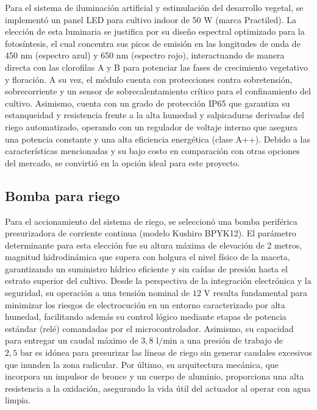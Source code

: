 Para el sistema de iluminación artificial y estimulación del desarrollo vegetal, se implementó un panel LED para cultivo indoor de 50 W (marca Practiled). La elección de esta luminaria se justifica por su diseño espectral optimizado para la fotosíntesis, el cual concentra sus picos de emisión en las longitudes de onda de 450 nm (espectro azul) y 650 nm (espectro rojo), interactuando de manera directa con las clorofilas A y B para potenciar las fases de crecimiento vegetativo y floración. A su vez, el módulo cuenta con protecciones contra sobretensión, sobrecorriente y un sensor de sobrecalentamiento crítico para el confinamiento del cultivo. Asimismo, cuenta con un grado de protección IP65 que garantiza su estanqueidad y resistencia frente a la alta humedad y salpicaduras derivadas del riego automatizado, operando con un regulador de voltaje interno que asegura una potencia constante y una alta eficiencia energética (clase A++). Debido a las características mencionadas y su bajo costo en comparación con otras opciones del mercado, se convirtió en la opción ideal para este proyecto.

\subsection{Bomba para riego}

Para el accionamiento del sistema de riego, se seleccionó una bomba periférica presurizadora de corriente continua (modelo Kushiro BPYK12). El parámetro determinante para esta elección fue su altura máxima de elevación de 2 metros, magnitud hidrodinámica que supera con holgura el nivel físico de la maceta, garantizando un suministro hídrico eficiente y sin caídas de presión hasta el estrato superior del cultivo. Desde la perspectiva de la integración electrónica y la seguridad, su operación a una tensión nominal de $12\text{ V}$ resulta fundamental para minimizar los riesgos de electrocución en un entorno caracterizado por alta humedad, facilitando además su control lógico mediante etapas de potencia estándar (relé) comandadas por el microcontrolador. Asimismo, su capacidad para entregar un caudal máximo de $3{,}8\text{ l/min}$ a una presión de trabajo de $2{,}5\text{ bar}$ es idónea para presurizar las líneas de riego sin generar caudales excesivos que inunden la zona radicular. Por último, su arquitectura mecánica, que incorpora un impulsor de bronce y un cuerpo de aluminio, proporciona una alta resistencia a la oxidación, asegurando la vida útil del actuador al operar con agua limpia.

